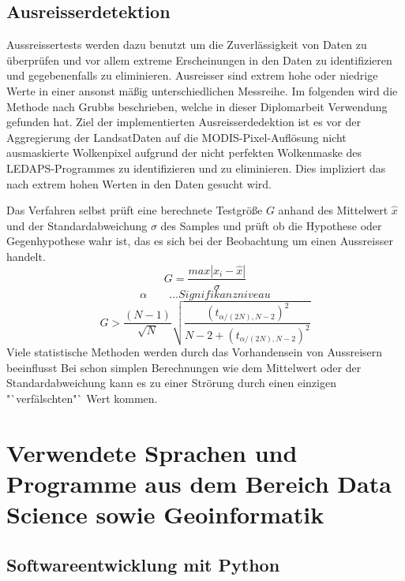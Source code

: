 \documentclass[11pt]{report}
\begin{document}
\subsection{Ausreisserdetektion}
Aussreissertests werden dazu benutzt um die Zuverlässigkeit von Daten zu überprüfen und vor allem extreme Erscheinungen in den Daten zu identifizieren und gegebenenfalls zu eliminieren. Ausreisser sind extrem hohe oder niedrige Werte in einer ansonst mäßig unterschiedlichen Messreihe. Im folgenden wird die Methode nach Grubbs beschrieben, welche in dieser Diplomarbeit Verwendung gefunden hat. Ziel der implementierten Ausreisserdedektion ist es vor der Aggregierung der LandsatDaten auf die MODIS-Pixel-Auflösung nicht ausmaskierte Wolkenpixel aufgrund der nicht perfekten Wolkenmaske des LEDAPS-Programmes zu identifizieren und zu eliminieren. Dies impliziert das nach extrem hohen Werten in den Daten gesucht wird. \newline

Das Verfahren selbst prüft eine berechnete Testgröße $G$ anhand des Mittelwert $\hat{x}$ und der Standardabweichung $\sigma$ des Samples und prüft ob die Hypothese oder Gegenhypothese wahr ist, das es sich bei der Beobachtung um einen Aussreisser handelt. \newline
\begin{equation}
G=\frac{max\left|x_i - \hat{x}\right|}{\sigma}
\end{equation}\newline
\begin{equation}
\alpha \qquad \dots Signifikanzniveau
\end{equation}\newline
\begin{equation}
G> \frac{(N-1)}{\sqrt{N}}\sqrt{\frac{(t_{\alpha / (2N),N-2})^2}{N-2+(t_{\alpha / (2N),N-2})^2}}
\end{equation}\newline
Viele statistische Methoden werden durch das Vorhandensein von Aussreisern beeinflusst  Bei schon simplen Berechnungen wie dem Mittelwert oder der Standardabweichung kann es zu einer Strörung durch einen einzigen "`verfälschten"` Wert kommen.

\section{Verwendete Sprachen und Programme aus dem Bereich Data Science sowie Geoinformatik}
\subsection{Softwareentwicklung mit Python}
\end{document}
